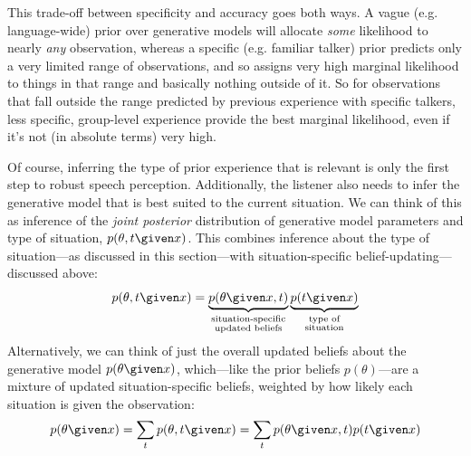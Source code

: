 This trade-off between specificity and accuracy goes both ways.  A vague (e.g. language-wide) prior over generative models will allocate \emph{some} likelihood to nearly \emph{any} observation, whereas a specific (e.g. familiar talker) prior predicts only a very limited range of observations, and so assigns very high marginal likelihood to things in that range and basically nothing outside of it.  So for observations that fall outside the range predicted by previous experience with specific talkers, less specific, group-level experience provide the best marginal likelihood, even if it's not (in absolute terms) very high.  

Of course, inferring the type of prior experience that is relevant is only the first step to robust speech perception.  Additionally, the listener also needs to infer the generative model that is best suited to the current situation.  We can think of this as inference of the \emph{joint posterior} distribution of generative model parameters and type of situation, $p(\theta, t \given x)$.  This combines inference about the type of situation---as discussed in this section---with situation-specific belief-updating---discussed above: 
\begin{equation}
  \label{eq:36}
  p(\theta, t \given x) = \underbrace{p(\theta \given x, t)}_{\substack{\textrm{situation-specific}\\\textrm{updated beliefs}}} \underbrace{p(t \given x)}_{\substack{\textrm{type of}\\\textrm{situation}}}
\end{equation}
Alternatively, we can think of just the overall updated beliefs about the generative model $p(\theta\given x)$, which---like the prior beliefs $p(\theta)$---are a mixture of updated situation-specific beliefs, weighted by how likely each situation is given the observation: 
\begin{equation}
  \label{eq:37}
  p(\theta \given x) = \sum_t p(\theta, t \given x) = \sum_t p(\theta \given x, t) p(t \given x)
\end{equation}

